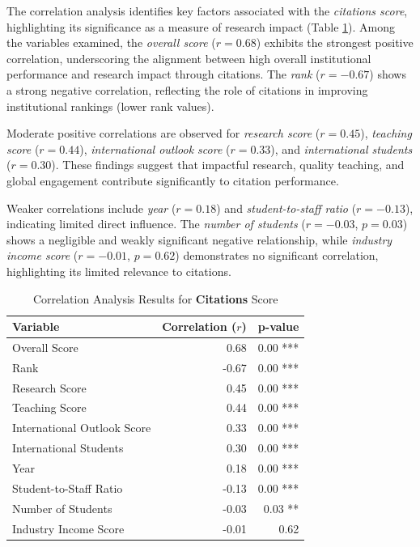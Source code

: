 \documentclass[conference]{IEEEtran}
\begin{document}
The correlation analysis identifies key factors associated with the \textit{citations score}, highlighting its significance as a measure of research impact (Table \ref{tab:correlation_citations}). Among the variables examined, the \textit{overall score} ($r = 0.68$) exhibits the strongest positive correlation, underscoring the alignment between high overall institutional performance and research impact through citations. The \textit{rank} ($r = -0.67$) shows a strong negative correlation, reflecting the role of citations in improving institutional rankings (lower rank values).

Moderate positive correlations are observed for \textit{research score} ($r = 0.45$), \textit{teaching score} ($r = 0.44$), \textit{international outlook score} ($r = 0.33$), and \textit{international students} ($r = 0.30$). These findings suggest that impactful research, quality teaching, and global engagement contribute significantly to citation performance.

Weaker correlations include \textit{year} ($r = 0.18$) and \textit{student-to-staff ratio} ($r = -0.13$), indicating limited direct influence. The \textit{number of students} ($r = -0.03$, $p = 0.03$) shows a negligible and weakly significant negative relationship, while \textit{industry income score} ($r = -0.01$, $p = 0.62$) demonstrates no significant correlation, highlighting its limited relevance to citations.

\begin{table}[h!]
	\centering
	\caption{Correlation Analysis Results for \textbf{Citations} Score}
	\label{tab:correlation_citations}
	\begin{tabular}{|l|r|r|}
		\hline
		\textbf{Variable} & \textbf{Correlation ($r$)} & \textbf{p-value} \\
		\hline
		Overall Score & 0.68 & 0.00 *** \\
		Rank & -0.67 & 0.00 *** \\
		Research Score & 0.45 & 0.00 *** \\
		Teaching Score & 0.44 & 0.00 *** \\
		International Outlook Score & 0.33 & 0.00 *** \\
		International Students & 0.30 & 0.00 *** \\
		Year & 0.18 & 0.00 *** \\
		Student-to-Staff Ratio & -0.13 & 0.00 *** \\
		Number of Students & -0.03 & 0.03 ** \\
		Industry Income Score & -0.01 & 0.62 \\
		\hline
	\end{tabular}
\end{table}
\end{document}
